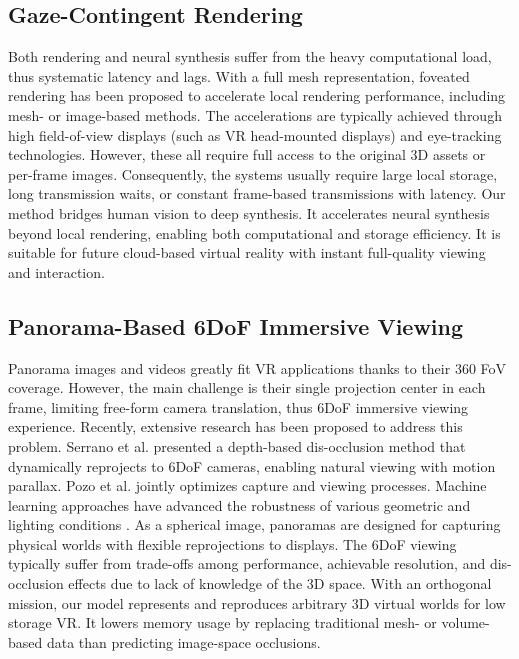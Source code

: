 \subsection{Gaze-Contingent Rendering}
Both rendering and neural synthesis suffer from the heavy computational load, thus systematic latency and lags.
With a full mesh representation, foveated rendering has been proposed to accelerate local rendering performance, including mesh- \cite{Guenter:2012:F3G,Patney:2016:TFR} or image-based \cite{Sun:2017:PGF,Kaplanyan:2019:DNR} methods. The accelerations are typically achieved through high field-of-view displays (such as VR head-mounted displays) and eye-tracking technologies. However, these all require full access to the original 3D assets or per-frame images. Consequently, the systems usually require large local storage, long transmission waits, or constant frame-based transmissions with latency. 
Our method bridges human vision to deep synthesis. It accelerates neural synthesis beyond local rendering, enabling both computational and storage efficiency. It is suitable for future cloud-based virtual reality with instant full-quality viewing and interaction.

\subsection{Panorama-Based 6DoF Immersive Viewing}
Panorama images and videos greatly fit VR applications thanks to their 360 FoV coverage. However, the main challenge is their single projection center in each frame, limiting free-form camera translation, thus 6DoF immersive viewing experience. 
Recently, extensive research has been proposed to address this problem. Serrano et al.  presented a depth-based dis-occlusion method that dynamically reprojects to 6DoF cameras, enabling natural viewing with motion parallax. Pozo et al.  jointly optimizes capture and viewing processes.
Machine learning approaches have advanced the robustness of various geometric and lighting conditions \cite{Attal:2020:ECCV,Lin:DeepPanorama,Benjamin:2020:RTV}. 
As a spherical image, panoramas are designed for capturing physical worlds with flexible reprojections to displays. The 6DoF viewing typically suffer from trade-offs among performance, achievable resolution, and dis-occlusion effects due to lack of knowledge of the 3D space.
With an orthogonal mission, our model represents and reproduces arbitrary 3D virtual worlds for low storage VR. It lowers memory usage by replacing traditional mesh- or volume-based data than predicting image-space occlusions.